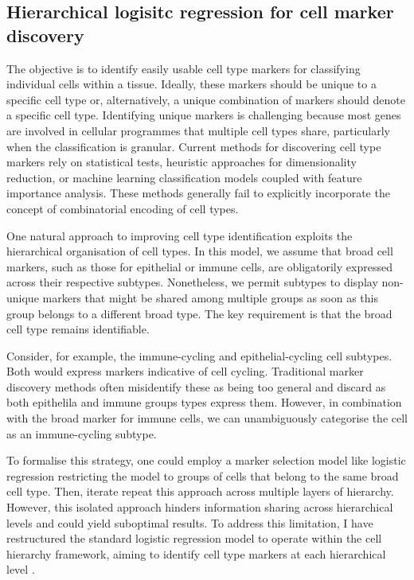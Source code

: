 \subsection{Hierarchical logisitc regression for cell marker discovery}
\label{sec:modalities-schierarchy}

The objective is to identify easily usable cell type markers for classifying individual cells within a tissue. Ideally, these markers should be unique to a specific cell type or, alternatively, a unique combination of markers should denote a specific cell type. Identifying unique markers is challenging because most genes are involved in cellular programmes that multiple cell types share, particularly when the classification is granular. Current methods for discovering cell type markers rely on statistical tests, heuristic approaches for dimensionality reduction, or machine learning classification models coupled with feature importance analysis. These methods generally fail to explicitly incorporate the concept of combinatorial encoding of cell types.

One natural approach to improving cell type identification exploits the hierarchical organisation of cell types. In this model, we assume that broad cell markers, such as those for epithelial or immune cells, are obligatorily expressed across their respective subtypes. Nonetheless, we permit subtypes to display non-unique markers that might be shared among multiple groups as soon as this group belongs to a different broad type. The key requirement is that the broad cell type remains identifiable.

Consider, for example, the immune-cycling and epithelial-cycling cell subtypes. Both would express markers indicative of cell cycling. Traditional marker discovery methods often misidentify these as being too general and discard as both epithelila and immune groups types express them. However, in combination with the broad marker for immune cells, we can unambiguously categorise the cell as an immune-cycling subtype.

To formalise this strategy, one could employ a marker selection model like logistic regression restricting the model to groups of cells that belong to the same broad cell type. Then, iterate repeat this approach across multiple layers of hierarchy. However, this isolated approach hinders information sharing across hierarchical levels and could yield suboptimal results. To address this limitation, I have restructured the standard logistic regression model to operate within the cell hierarchy framework, aiming to identify cell type markers at each hierarchical level .

